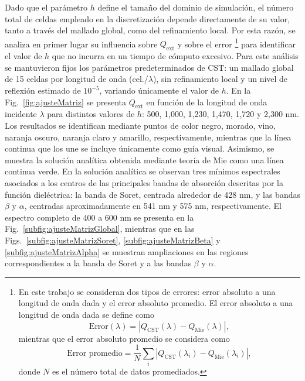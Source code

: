 Dado que el parámetro $h$ define el tamaño del dominio de simulación, el número total de celdas empleado en la discretización depende directamente de su valor, tanto a través del mallado global, como del refinamiento local. Por esta razón, se analiza en primer lugar su influencia sobre $Q_{\text{ext}}$ y sobre el error%
\footnote{En este trabajo se consideran dos tipos de errores: error absoluto a una longitud de onda dada y el error absoluto promedio. El error absoluto a una longitud de onda dada se define como
	$$\text{Error}(\lambda)=|Q_{\text{CST}}(\lambda)-Q_{\text{Mie}}(\lambda)|,$$
	mientras que el error absoluto promedio se considera como 
	$$\text{Error promedio}=\frac{1}{N}\sum_i|Q_{\text{CST}}(\lambda_i)-Q_{\text{Mie}}(\lambda_i)|,$$
	donde $N$ es el número total de datos promediados.} %
para identificar el valor de $h$ que no incurra en un tiempo de cómputo excesivo. Para este análisis se mantuvieron fijos los parámetros predeterminados de CST: un mallado global de 15 celdas por longitud de onda (cel./$\lambda$), sin refinamiento local y un nivel de reflexión estimado de $10^{-5}$, variando únicamente el valor de $h$. En la Fig.~\ref{fig:ajusteMatriz} se presenta $Q_{\text{ext}}$ en función de la longitud de onda incidente $\lambda$ para distintos valores de $h$: 500, 1,000, 1,230, 1,470, 1,720 y 2,300 nm. Los resultados se identifican mediante puntos de color negro, morado, vino, naranja oscuro, naranja claro y amarillo, respectivamente, mientras que la línea continua que los une se incluye únicamente como guía visual. Asimismo, se muestra la solución analítica obtenida mediante teoría de Mie como una línea continua verde. En la solución analítica se observan tres mínimos espectrales asociados a los centros de las principales bandas de absorción descritas por la función dieléctrica: la banda de Soret, centrada alrededor de 428 nm, y las bandas $\beta$ y $\alpha$, centradas aproximadamente en 541 nm y 575 nm, respectivamente. El espectro completo de 400 a 600 nm se presenta en la Fig.~\ref{subfig:ajusteMatrizGlobal}, mientras que en las Figs.~\ref{subfig:ajusteMatrizSoret}, \ref{subfig:ajusteMatrizBeta} y \ref{subfig:ajusteMatrizAlpha} se muestran ampliaciones en las regiones correspondientes a la banda de Soret y a las bandas $\beta$ y $\alpha$. %
%


